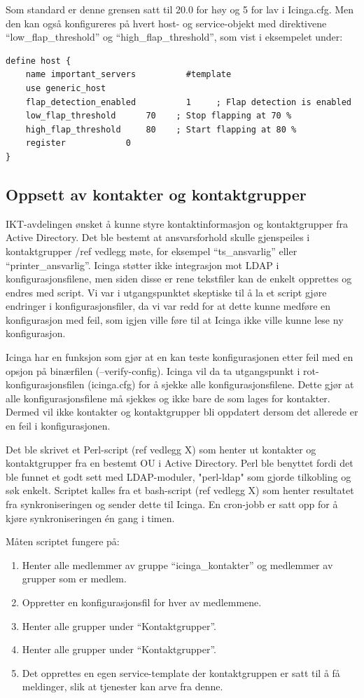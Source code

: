 Som standard er denne grensen satt til 20.0 for høy og 5 for lav i Icinga.cfg. Men den kan også konfigureres på hvert host- og service-objekt med direktivene “low\_flap\_threshold” og “high\_flap\_threshold”, som vist i eksempelet under:

\begin{lstlisting}
define host {
	name important_servers  		#template
	use generic_host
	flap_detection_enabled          1     ; Flap detection is enabled
	low_flap_threshold		70    ; Stop flapping at 70 %
	high_flap_threshold		80    ; Start flapping at 80 %
	register			0
}
\end{lstlisting}

\subsection{Oppsett av kontakter og kontaktgrupper}


IKT-avdelingen ønsket å kunne styre kontaktinformasjon og kontaktgrupper fra Active Directory. Det ble bestemt at ansvarsforhold skulle gjenspeiles i kontaktgrupper /ref vedlegg møte, for eksempel “ts\_ansvarlig” eller “printer\_ansvarlig”. Icinga støtter ikke integrasjon mot LDAP i konfigurasjonsfilene, men siden disse er rene tekstfiler kan de enkelt opprettes og endres med script. Vi var i utgangspunktet skeptiske til å la et script gjøre endringer i konfigurasjonsfiler, da vi var redd for at dette kunne medføre en konfigurasjon med feil, som igjen ville føre til at Icinga ikke ville kunne lese ny konfigurasjon. 

Icinga har en funksjon som gjør at en kan teste konfigurasjonen etter feil med en opsjon på binærfilen (--verify-config). Icinga vil da ta utgangspunkt i rot-konfigurasjonsfilen (icinga.cfg) for å sjekke alle konfigurasjonsfilene. Dette gjør at alle konfigurasjonsfilene må sjekkes og ikke bare de som lages for kontakter. Dermed vil ikke kontakter og kontaktgrupper bli oppdatert dersom det allerede er en feil i konfigurasjonen. 

Det ble skrivet et Perl-script (ref vedlegg X) som henter ut kontakter og kontaktgrupper fra en bestemt OU i Active Directory. Perl ble benyttet fordi det ble funnet et godt sett med LDAP-moduler, "perl-ldap" \cite{perlldap} som gjorde tilkobling og søk enkelt. Scriptet kalles fra et bash-script (ref vedlegg X) som henter resultatet fra synkroniseringen og sender dette til Icinga. En cron-jobb er satt opp for å kjøre synkroniseringen én gang i timen.

Måten scriptet fungere på:
\begin{enumerate}
	\item Henter alle medlemmer av gruppe “icinga\_kontakter” og medlemmer av grupper som er medlem.
	\item Oppretter en konfigurasjonsfil for hver av medlemmene.
	\item Henter alle grupper under “Kontaktgrupper”.
	\item Henter alle grupper under “Kontaktgrupper”.
	\item Det opprettes en egen service-template der kontaktgruppen er satt til å få meldinger, slik at tjenester kan arve fra denne.
\end{enumerate}

